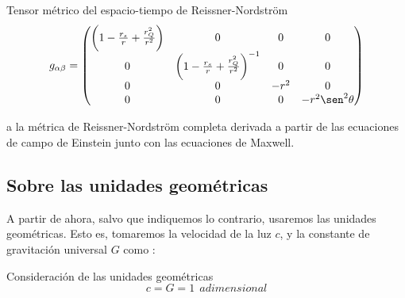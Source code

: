 \begin{remarkbox}{Tensor métrico del espacio-tiempo de Reissner-Nordström}
\begin{equation*}
g_{\alpha\beta} = \begin{pmatrix}
\biggr(1 - \frac{r_s}{r} + \frac{r_Q^2}{r^2}\biggr) & 0 & 0 & 0 \\
0 & \biggr(1 - \frac{r_s}{r} + \frac{r_Q^2}{r^2}\biggr)^{-1} & 0 & 0\\
0 & 0 & -r^2 & 0 \\
0 & 0 & 0 & -r^2\sen^2{\theta} \\
\end{pmatrix}
\end{equation*}
\end{remarkbox}

 a la métrica de Reissner-Nordström completa derivada a partir de las ecuaciones de campo de Einstein junto con las ecuaciones de Maxwell. 


\subsection*{\textbf{Sobre las unidades geométricas}}
A partir de ahora, salvo que indiquemos lo contrario, usaremos las unidades geométricas. Esto es, tomaremos la velocidad de la luz $c$, y la constante de gravitación universal $G$ como :

\begin{remarkbox}{Consideración de las unidades geométricas}
\begin{equation*}
    c=G=1\ \ \textit{adimensional}
\end{equation*}
\end{remarkbox}

